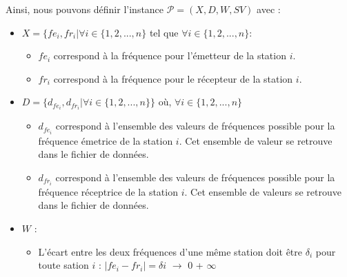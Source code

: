 \documentclass[a4paper, 10pt]{article}
\begin{document}
    Ainsi, nous pouvons définir l'instance $\mathcal{P} = (X, D, W, SV)$ avec :
    \begin{itemize}
      \item $X = \{ fe_i, fr_i | \forall i \in \{1,2,...,n\}$ tel que $\forall i \in \{1,2,...,n\}$:
            \begin{itemize}
              \item $fe_{i}$ correspond à la fréquence pour l'émetteur de la station $i$.
              \item $fr_{i}$ correspond à la fréquence pour le récepteur de la station $i$.
            \end{itemize}
      \item $D = \{d_{fe_i}, d_{fr_i} | \forall i \in \{1,2,...,n\} \}$ où, $\forall i \in \{1,2,...,n\}$
            \begin{itemize}
              \item $d_{fe_i}$ correspond à l'ensemble des valeurs de fréquences possible pour la fréquence émetrice de la station $i$. Cet ensemble de valeur se retrouve dans le fichier de données.
              \item $d_{fr_i}$ correspond à l'ensemble des valeurs de fréquences possible pour la fréquence réceptrice de la station $i$. Cet ensemble de valeurs se retrouve dans le fichier de données.
            \end{itemize}
      \item $W$ :
            \begin{itemize}
              \item L'écart entre les deux fréquences d'une même station doit être $\delta_{i}$ pour toute sation $i$ :
               $| fe_{i} - fr_{i} | = \delta{i}$ $\rightarrow$ \color{green} 0 \color{red} + $\infty$ \color{black}


\end{itemize}
\end{itemize}
\end{document}

